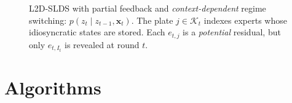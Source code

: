 \begin{figure}[H]
    \caption{L2D-SLDS with partial feedback and \emph{context-dependent} regime switching:
\(p(z_t\mid z_{t-1},\mathbf{x}_t)\). The plate \(j\in\mathcal{K}_t\) indexes experts whose
idiosyncratic states are stored. Each \(e_{t,j}\) is a \emph{potential} residual, but only \(e_{t,I_t}\)
is revealed at round \(t\).}
    \label{fig:slds_pgm_final}
\end{figure}

\section{Algorithms} \label{algo}






